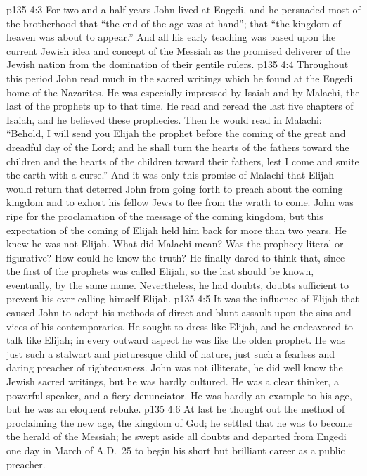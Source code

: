 \vs p135 4:3 For two and a half years John lived at Engedi, and he persuaded most of the brotherhood that “the end of the age was at hand”; that “the kingdom of heaven was about to appear.” And all his early teaching was based upon the current Jewish idea and concept of the Messiah as the promised deliverer of the Jewish nation from the domination of their gentile rulers.
\vs p135 4:4 Throughout this period John read much in the sacred writings which he found at the Engedi home of the Nazarites. He was especially impressed by Isaiah and by Malachi, the last of the prophets up to that time. He read and reread the last five chapters of Isaiah, and he believed these prophecies. Then he would read in Malachi: “Behold, I will send you Elijah the prophet before the coming of the great and dreadful day of the Lord; and he shall turn the hearts of the fathers toward the children and the hearts of the children toward their fathers, lest I come and smite the earth with a curse.” And it was only this promise of Malachi that Elijah would return that deterred John from going forth to preach about the coming kingdom and to exhort his fellow Jews to flee from the wrath to come. John was ripe for the proclamation of the message of the coming kingdom, but this expectation of the coming of Elijah held him back for more than two years. He knew he was not Elijah. What did Malachi mean? Was the prophecy literal or figurative? How could he know the truth? He finally dared to think that, since the first of the prophets was called Elijah, so the last should be known, eventually, by the same name. Nevertheless, he had doubts, doubts sufficient to prevent his ever calling himself Elijah.
\vs p135 4:5 It was the influence of Elijah that caused John to adopt his methods of direct and blunt assault upon the sins and vices of his contemporaries. He sought to dress like Elijah, and he endeavored to talk like Elijah; in every outward aspect he was like the olden prophet. He was just such a stalwart and picturesque child of nature, just such a fearless and daring preacher of righteousness. John was not illiterate, he did well know the Jewish sacred writings, but he was hardly cultured. He was a clear thinker, a powerful speaker, and a fiery denunciator. He was hardly an example to his age, but he was an eloquent rebuke.
\vs p135 4:6 At last he thought out the method of proclaiming the new age, the kingdom of God; he settled that he was to become the herald of the Messiah; he swept aside all doubts and departed from Engedi one day in March of A.D.~25 to begin his short but brilliant career as a public preacher.
